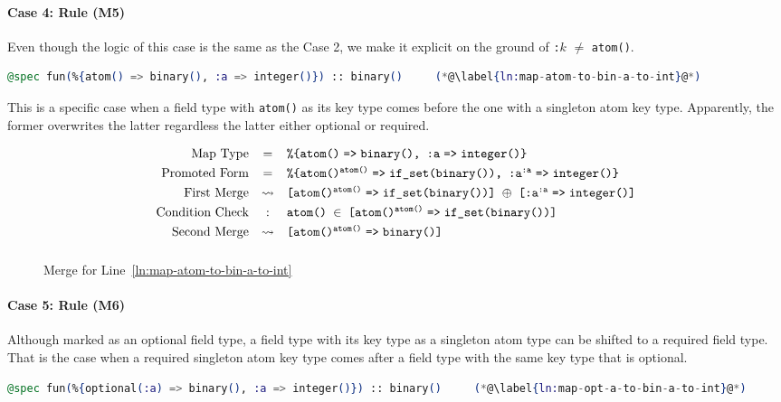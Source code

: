 \paragraph{Case 4: Rule \textsc{(M5)}}
Even though the logic of this case is the same as the Case 2, we make it explicit on the ground of \texttt{:$k$} $\neq$ \texttt{atom()}.

\begin{lstlisting}[language=Elixir, firstnumber=last]
@spec fun(%{atom() => binary(), :a => integer()}) :: binary()     (*@\label{ln:map-atom-to-bin-a-to-int}@*)
\end{lstlisting}

This is a specific case when a field type with \texttt{atom()} as its key type comes before the one with a singleton atom key type.
Apparently, the former overwrites the latter regardless the latter either optional or required.

\begin{figure}[H]
   \[\begin{array}{rcl}
      \text{Map Type} 
      &=& \texttt{\%\{atom()\fto binary(), :a\fto integer()\}}
      \\[0.8ex]
      \text{Promoted Form}
      &=& \texttt{\%\{\prokey{atom()}{atom()}\fto if\_set(binary()), \prokey{:a}{:a}\fto integer()\}}
      \\[0.8ex]
      \text{First Merge}
      &\leadsto& \texttt{[\prokey{atom()}{atom()}\fto if\_set(binary())] $\oplus$ [\prokey{:a}{:a}\fto integer()]}
      \\[0.8ex]
      \text{Condition Check}
      &:& \texttt{atom() $\in$ [\prokey{atom()}{atom()}\fto if\_set(binary())]}
      \\[0.8ex]
      \text{Second Merge}
      &\leadsto& \texttt{[\prokey{atom()}{atom()}\fto binary()]}
      \nl
   \end{array}\]
   \caption{Merge for Line~\ref{ln:map-atom-to-bin-a-to-int}}
\end{figure}

\paragraph{Case 5: Rule \textsc{(M6)}}
Although marked as an optional field type, a field type with its key type as a singleton atom type can be shifted to a required field type.
That is the case when a required singleton atom key type comes after a field type with the same key type that is optional.

\begin{lstlisting}[language=Elixir, firstnumber=last]
@spec fun(%{optional(:a) => binary(), :a => integer()}) :: binary()     (*@\label{ln:map-opt-a-to-bin-a-to-int}@*)
\end{lstlisting}

